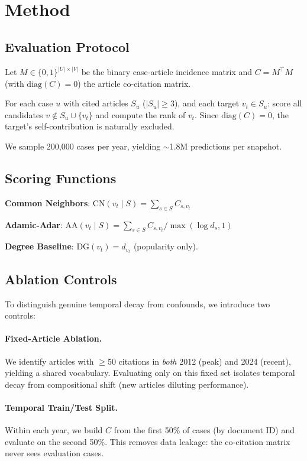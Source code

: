 \documentclass[11pt]{article}
\begin{document}
\section{Method}
\label{sec:method}

\subsection{Evaluation Protocol}

Let $M \in \{0,1\}^{|U| \times |V|}$ be the binary case-article incidence matrix and $C = M^\top M$ (with $\text{diag}(C) = 0$) the article co-citation matrix.

For each case $u$ with cited articles $S_u$ ($|S_u| \geq 3$), and each target $v_t \in S_u$:
score all candidates $v \notin S_u \cup \{v_t\}$ and compute the rank of $v_t$.
Since $\text{diag}(C) = 0$, the target's self-contribution is naturally excluded.

We sample 200{,}000 cases per year, yielding $\sim$1.8M predictions per snapshot.

\subsection{Scoring Functions}

\textbf{Common Neighbors}: $\text{CN}(v_t \mid S) = \sum_{s \in S} C_{s, v_t}$

\textbf{Adamic-Adar}: $\text{AA}(v_t \mid S) = \sum_{s \in S} C_{s, v_t} / \max(\log d_s, 1)$

\textbf{Degree Baseline}: $\text{DG}(v_t) = d_{v_t}$ (popularity only).

\subsection{Ablation Controls}

To distinguish genuine temporal decay from confounds, we introduce two controls:

\paragraph{Fixed-Article Ablation.}
We identify articles with $\geq$50 citations in \emph{both} 2012 (peak) and 2024 (recent), yielding a shared vocabulary.
Evaluating only on this fixed set isolates temporal decay from compositional shift (new articles diluting performance).

\paragraph{Temporal Train/Test Split.}
Within each year, we build $C$ from the first 50\% of cases (by document ID) and evaluate on the second 50\%.
This removes data leakage: the co-citation matrix never sees evaluation cases.
\end{document}
